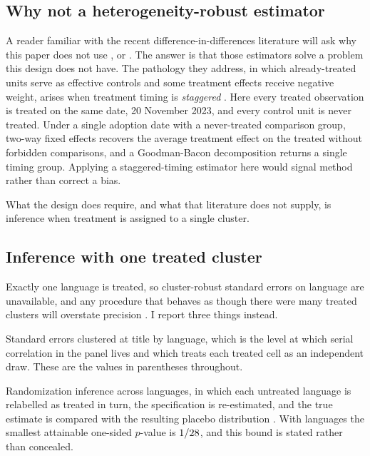 \documentclass[11pt]{article}
\begin{document}
\subsection{Why not a heterogeneity-robust estimator}\label{sec:estimator}

A reader familiar with the recent difference-in-differences literature will ask why this paper does
not use \citet{callaway2021}, \citet{sunabraham2021} or \citet{bjs2024}. The answer is that those
estimators solve a problem this design does not have. The pathology they address, in which
already-treated units serve as effective controls and some treatment effects receive negative
weight, arises when treatment timing is \emph{staggered} \citep{goodmanbacon2021}. Here every
treated observation is treated on the same date, 20 November 2023, and every control unit is never
treated. Under a single adoption date with a never-treated comparison group, two-way fixed effects
recovers the average treatment effect on the treated without forbidden comparisons, and a
Goodman-Bacon decomposition returns a single timing group. Applying a staggered-timing estimator
here would signal method rather than correct a bias.

What the design does require, and what that literature does not supply, is inference when treatment
is assigned to a single cluster.

\subsection{Inference with one treated cluster}

Exactly one language is treated, so cluster-robust standard errors on language are unavailable, and
any procedure that behaves as though there were many treated clusters will overstate precision
\citep{bertrand2004,cameron2008,conley2011}. I report three things instead.

Standard errors clustered at title by language, which is the level at which serial correlation in
the panel lives and which treats each treated cell as an independent draw. These are the values in
parentheses throughout.

Randomization inference across languages, in which each untreated language is relabelled as treated
in turn, the specification is re-estimated, and the true estimate is compared with the resulting
placebo distribution \citep{young2019}. With \riN{} languages the smallest attainable one-sided
$p$-value is $1/28$, and this bound is stated rather than concealed.
\end{document}
